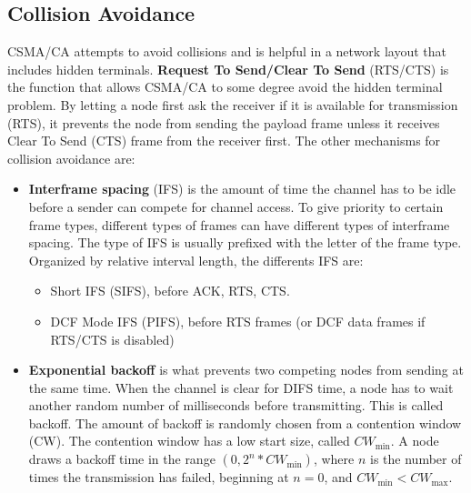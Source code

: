      \subsection{Collision Avoidance}
CSMA/CA attempts to avoid collisions and is helpful in a network layout that includes hidden terminals. \textbf{Request To Send/Clear To Send} (RTS/CTS)
	is the function that allows CSMA/CA to some degree avoid the hidden terminal problem. By letting a node first ask the receiver if it is
	available for transmission (RTS), it prevents the node from sending the payload frame unless it receives Clear To Send (CTS) frame from the receiver first.
	The other mechanisms for collision avoidance are: 
	\begin{itemize}	
	\item \textbf{Interframe spacing} (IFS) is the amount of time the channel has to be idle before a sender can compete for channel access. 
	To give priority to certain frame types, different types of frames can have different types of interframe spacing. The type of IFS is usually 
	prefixed with the letter of the frame type. Organized by relative interval length, the differents IFS are:
	\begin{itemize} 
	\item Short IFS (SIFS), before ACK, RTS, CTS.  
\item DCF Mode IFS (PIFS), before RTS frames (or DCF data frames if RTS/CTS is disabled)

	\end{itemize}
	\item \textbf{Exponential backoff} is what prevents two competing nodes from sending at the same time. When the channel is clear
	for DIFS time, a node has to wait another  random number of milliseconds before transmitting. This is called backoff.
	The amount of backoff is randomly chosen from a contention window (CW). The contention window has a low start size,
	called $CW_{\text{min}}$. A node draws a backoff time in the range $(0, 2^n*CW_{\text{min}})$, where $n$ is the number 
	of times the transmission has failed, beginning at $n=0$, and $CW_{\text{min}}<CW_{\text{max}}$.
	\end{itemize}

